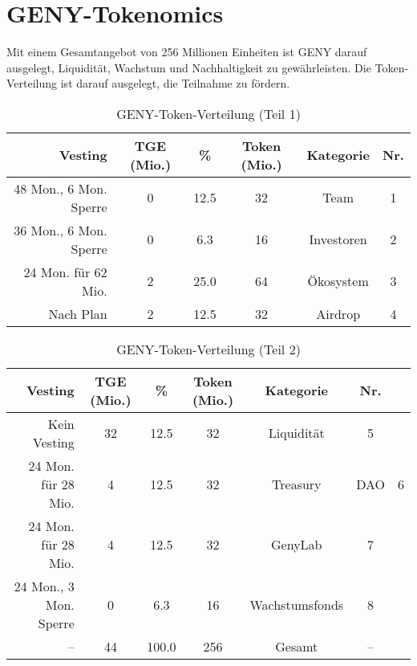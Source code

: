 \documentclass[a4paper,12pt,openany]{book}
\begin{document}
\section*{GENY-Tokenomics}
Mit einem Gesamtangebot von 256 Millionen Einheiten ist GENY darauf ausgelegt, Liquidität, Wachstum und Nachhaltigkeit zu gewährleisten. Die Token-Verteilung ist darauf ausgelegt, die Teilnahme zu fördern.

\begin{table}[h]
\centering
\caption{GENY-Token-Verteilung (Teil 1)}
\small
\begin{tabular}{r c c c c c}
\hline
\textbf{Vesting} & \textbf{TGE (Mio.)} & \textbf{\%} & \textbf{Token (Mio.)} & \textbf{Kategorie} & \textbf{Nr.} \\
\hline
48 Mon., 6 Mon. Sperre & 0 & 12.5 & 32 & Team & 1 \\
36 Mon., 6 Mon. Sperre & 0 & 6.3 & 16 & Investoren & 2 \\
24 Mon. für 62 Mio. & 2 & 25.0 & 64 & Ökosystem & 3 \\
Nach Plan & 2 & 12.5 & 32 & Airdrop & 4 \\
\hline
\end{tabular}
\end{table}

\begin{table}[h]
\centering
\caption{GENY-Token-Verteilung (Teil 2)}
\small
\begin{tabular}{r c c c c c}
\hline
\textbf{Vesting} & \textbf{TGE (Mio.)} & \textbf{\%} & \textbf{Token (Mio.)} & \textbf{Kategorie} & \textbf{Nr.} \\
\hline
Kein Vesting & 32 & 12.5 & 32 & Liquidität & 5 \\
24 Mon. für 28 Mio. & 4 & 12.5 & 32 & Treasury & DAO & 6 \\
24 Mon. für 28 Mio. & 4 & 12.5 & 32 & GenyLab & 7 \\
24 Mon., 3 Mon. Sperre & 0 & 6.3 & 16 & Wachstumsfonds & 8 \\
\hline
-- & 44 & 100.0 & 256 & Gesamt & -- \\
\hline
\end{tabular}
\end{table}
\end{document}
